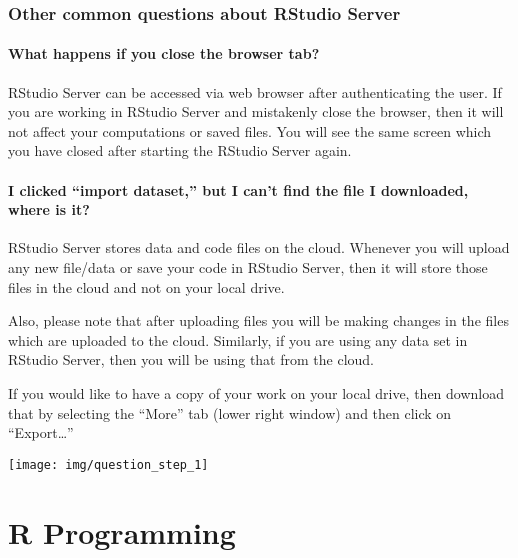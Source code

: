 \documentclass[
]{book}
\begin{document}
\hypertarget{other-common-questions-about-rstudio-server}{%
\section{Other common questions about RStudio Server}\label{other-common-questions-about-rstudio-server}}

\hypertarget{what-happens-if-you-close-the-browser-tab}{%
\subsection{What happens if you close the browser tab?}\label{what-happens-if-you-close-the-browser-tab}}

RStudio Server can be accessed via web browser after authenticating the user. If you are working in RStudio Server and mistakenly close the browser, then it will not affect your computations or saved files. You will see the same screen which you have closed after starting the RStudio Server again.

\hypertarget{i-clicked-import-dataset-but-i-cant-find-the-file-i-downloaded-where-is-it}{%
\subsection{I clicked ``import dataset,'' but I can't find the file I downloaded, where is it?}\label{i-clicked-import-dataset-but-i-cant-find-the-file-i-downloaded-where-is-it}}

RStudio Server stores data and code files on the cloud. Whenever you will upload any new file/data or save your code in RStudio Server, then it will store those files in the cloud and not on your local drive.

Also, please note that after uploading files you will be making changes in the files which are uploaded to the cloud. Similarly, if you are using any data set in RStudio Server, then you will be using that from the cloud.

If you would like to have a copy of your work on your local drive, then download that by selecting the ``More'' tab (lower right window) and then click on ``Export\ldots{}''

\begin{center}\texttt{[image: img/question\_step\_1]} \end{center}

\hypertarget{part-r-programming}{%
\part{R Programming}\label{part-r-programming}}
\end{document}
